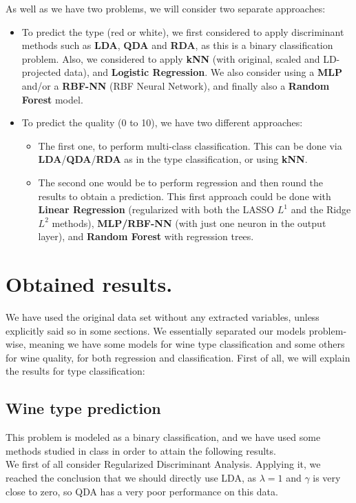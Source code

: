 \documentclass[10pt]{article}
\begin{document}
As well as we have two problems, we will consider two separate approaches:
\begin{itemize}
	\item To predict the type (red or white), we first considered to apply discriminant methods such as \textbf{LDA}, \textbf{QDA} and \textbf{RDA}, as this is a binary classification problem. Also, we considered to apply \textbf{kNN} (with original, scaled and LD-projected data), and \textbf{Logistic Regression}. We also consider using a \textbf{MLP} and/or a \textbf{RBF-NN} (RBF Neural Network), and finally also a \textbf{Random Forest} model.
	\item To predict the quality (0 to 10), we have two different approaches: 
	\begin{itemize}
		\item The first one, to perform multi-class classification. This can be done via \textbf{LDA}/\textbf{QDA}/\textbf{RDA} as in the type classification, or using \textbf{kNN}.
		\item The second one would be to perform regression and then round the results to obtain a prediction. This first approach could be done with \textbf{Linear Regression} (regularized with both the LASSO $L^1$ and the Ridge $L^2$ methods), \textbf{MLP/RBF-NN} (with just one neuron in the output layer), and \textbf{Random Forest} with regression trees.
	\end{itemize}		
\end{itemize}

\section{Obtained results.}
We have used the original data set without any extracted variables, unless explicitly said so in some sections. We essentially separated our models problem-wise, meaning we have some models for wine type classification and some others for wine quality, for both regression and classification. First of all, we will explain the results for type classification:
\subsection{Wine type prediction}
This problem is modeled as a binary classification, and we have used some methods studied in class in order to attain the following results.\\

We first of all consider Regularized Discriminant Analysis. Applying it, we reached the conclusion that we should directly use LDA, as $\lambda=1$ and $\gamma$ is very close to zero, so QDA has a very poor performance on this data.\\
\end{document}
